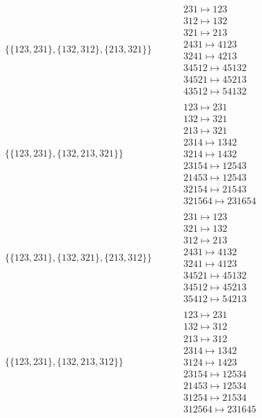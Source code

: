 \begin{tiny}
\begin{align}
\begin{matrix}
\end{matrix}
\\
\{\{123, 231\}, \{132, 312\}, \{213, 321\}\}
\quad
&
\phantom{.}
&
\begin{matrix}
231 \mapsto 123\\312 \mapsto 132\\321 \mapsto 213\\2431 \mapsto 4123\\3241 \mapsto 4213\\34512 \mapsto 45132\\34521 \mapsto 45213\\43512 \mapsto 54132
\end{matrix}
\\
\{\{123, 231\}, \{132, 213, 321\}\}
\quad
&
\phantom{.}
&
\begin{matrix}
123 \mapsto 231\\132 \mapsto 321\\213 \mapsto 321\\2314 \mapsto 1342\\3214 \mapsto 1432\\23154 \mapsto 12543\\21453 \mapsto 12543\\32154 \mapsto 21543\\321564 \mapsto 231654
\end{matrix}
\\
\{\{123, 231\}, \{132, 321\}, \{213, 312\}\}
\quad
&
\phantom{.}
&
\begin{matrix}
231 \mapsto 123\\321 \mapsto 132\\312 \mapsto 213\\2431 \mapsto 4132\\3241 \mapsto 4123\\34521 \mapsto 45132\\34512 \mapsto 45213\\35412 \mapsto 54213
\end{matrix}
\\
\{\{123, 231\}, \{132, 213, 312\}\}
\quad
&
\phantom{.}
&
\begin{matrix}
123 \mapsto 231\\132 \mapsto 312\\213 \mapsto 312\\2314 \mapsto 1342\\3124 \mapsto 1423\\23154 \mapsto 12534\\21453 \mapsto 12534\\31254 \mapsto 21534\\312564 \mapsto 231645

\end{matrix}
\end{align}
\end{tiny}
